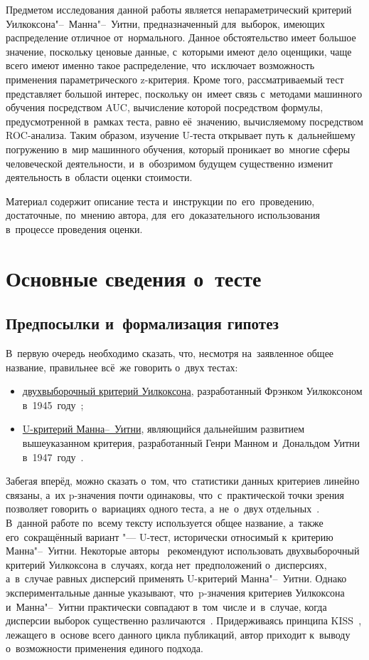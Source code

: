 \documentclass[]{scrreprt}
\begin{document}
Предметом исследования данной работы является непараметрический критерий Уилкоксона"--~Манна"--~Уитни, предназначенный для~выборок, имеющих распределение отличное от~нормального. Данное обстоятельство имеет большое значение, поскольку ценовые данные, с~которыми имеют дело оценщики, чаще всего имеют именно такое распределение, что~исключает возможность применения параметрического z-критерия. Кроме того, рассматриваемый тест представляет большой интерес, поскольку он~имеет связь с~методами машинного обучения посредством AUC, вычисление которой посредством формулы, предусмотренной в~рамках теста, равно её~значению, вычисляемому посредством ROC-анализа. Таким образом, изучение U-теста открывает путь к~дальнейшему погружению в~мир машинного обучения, который проникает во~многие сферы человеческой деятельности, и~в~обозримом будущем существенно изменит деятельность в~области оценки стоимости.

Материал содержит описание теста и~инструкции по~его~проведению, достаточные, по~мнению автора, для~его~доказательного использования в~процессе проведения оценки.  

\chapter{Основные сведения о~тесте}
\section{Предпосылки и~формализация гипотез}
В~первую очередь необходимо сказать, что, несмотря на~заявленное общее название, правильнее всё~же говорить о~двух тестах:
\begin{itemize}
	\item \href{http://www.machinelearning.ru/wiki/index.php?title=Критерий_Уилкоксона_двухвыборочный}{двухвыборочный критерий Уилкоксона}, разработанный Фрэнком Уилкоксоном в~1945~году~\cite{MLRU:Wilcoxon-test};
	\item \href{http://www.machinelearning.ru/wiki/index.php?title=Критерий_Уилкоксона-Манна"--~Уитни}{U-критерий Манна--~Уитни}, являющийся дальнейшим развитием вышеуказанном критерия, разработанный Генри Манном и~Дональдом Уитни в~1947~году~\cite{MLRU:Mann-Whitney}.
\end{itemize}
Забегая вперёд, можно сказать о~том, что~статистики данных критериев линейно связаны, а~их p-значения почти одинаковы, что~с~практической точки зрения позволяет говорить о~вариациях одного теста, а~не~о~двух отдельных~\cite{MLRU:Wilcoxon-test}. В~данной работе по~всему тексту используется общее название, а~также его~сокращённый вариант "--- U-тест, исторически относимый к~критерию Манна"--~Уитни. Некоторые авторы~\cite{Kobzarq-prikl-mathstat} рекомендуют использовать двухвыборочный критерий Уилкоксона в~случаях, когда нет~предположений о~дисперсиях, а~в~случае равных дисперсий применять U-критерий Манна"--~Уитни. Однако экспериментальные данные указывают, что~p-значения критериев Уилкоксона и~Манна"--~Уитни практически совпадают в~том~числе и~в~случае, когда дисперсии выборок существенно различаются~\cite{MLRU:Wilcoxon-test}. Придерживаясь принципа KISS~\cite{KISS-principle}, лежащего в~основе всего данного цикла публикаций, автор приходит к~выводу о~возможности применения единого подхода. 
\end{document}
